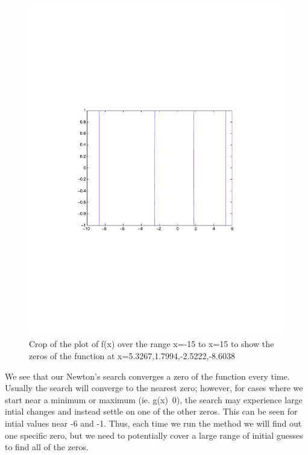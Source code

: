 \documentclass[11pt]{article}
\begin{document}
\begin{figure}[htbp]
	\centerline{\includegraphics[width=1\textwidth]{zeros.pdf}}
	\caption{\label{p1}%
	Crop of the plot of f(x) over the range x=-15 to x=15 to show the zeros of the function at x=5.3267,1.7994,-2.5222,-8.6038}
\end{figure}

We see that our Newton's search converges a zero of the function every time.  Usually the search will converge to the nearest zero; however, for cases where we start near a minimum or maximum (ie. g(x)~0), the search may experience large intial changes and instead settle on one of the other zeros.  This can be seen for intial values near -6 and -1.  Thus, each time we run the method we will find out one specific zero, but we need to potentially cover a large range of initial guesses to find all of the zeros.


%
%
%
\end{document}
